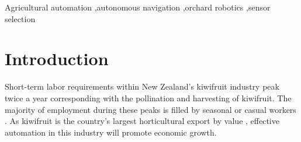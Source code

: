 \documentclass[preprint,authoryear,12pt]{elsarticle}
\begin{document}
\begin{frontmatter}
\begin{abstract}

\end{abstract}

\begin{keyword}

    Agricultural automation \sep autonomous navigation \sep orchard robotics \sep sensor selection
\end{keyword}

\end{frontmatter}


\section{Introduction}
\label{sect:intro}
    Short-term labor requirements within New Zealand's kiwifruit industry peak twice a year corresponding with the pollination and harvesting of kiwifruit.
    The majority of employment during these peaks is filled by seasonal or casual workers \citep{Timmins2009}.
    As kiwifruit is the country's largest horticultural export by value \citep{StatisticsNewZealand2015}, effective automation in this industry will promote economic growth.
\end{document}
